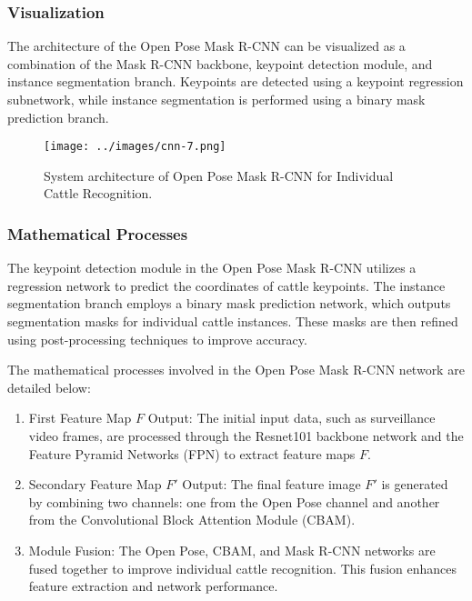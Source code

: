 \documentclass[journal, biblatex]{IEEEtran}
\begin{document}
\subsubsection{Visualization}
The architecture of the Open Pose Mask R-CNN can be visualized as a combination of the Mask R-CNN backbone, keypoint detection module, and instance segmentation branch. Keypoints are detected using a keypoint regression subnetwork, while instance segmentation is performed using a binary mask prediction branch.

\begin{figure}[htbp]
    \centering
    \texttt{[image: ../images/cnn-7.png]}
    \caption{System architecture of Open Pose Mask R-CNN for Individual Cattle Recognition.}
    \label{fig:system_architecture}
\end{figure}

\subsubsection{Mathematical Processes}
The keypoint detection module in the Open Pose Mask R-CNN utilizes a regression network to predict the coordinates of cattle keypoints. The instance segmentation branch employs a binary mask prediction network, which outputs segmentation masks for individual cattle instances. These masks are then refined using post-processing techniques to improve accuracy.

The mathematical processes involved in the Open Pose Mask R-CNN network are detailed below:

\begin{enumerate}
    \item First Feature Map \( F \) Output: The initial input data, such as surveillance video frames, are processed through the Resnet101 backbone network and the Feature Pyramid Networks (FPN) to extract feature maps \( F \).
    
    \item Secondary Feature Map \( F' \) Output: The final feature image \( F' \) is generated by combining two channels: one from the Open Pose channel and another from the Convolutional Block Attention Module (CBAM).
    
    \item Module Fusion: The Open Pose, CBAM, and Mask R-CNN networks are fused together to improve individual cattle recognition. This fusion enhances feature extraction and network performance.
\end{enumerate}
\end{document}

